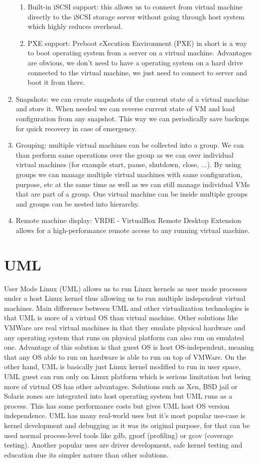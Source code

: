 \begin{enumerate}
\begin{enumerate}
\item Built-in iSCSI support: this allows us to connect from virtual machine directly to the iSCSI storage server without going through host system which
highly reduces overhead.
\item PXE support: Preboot eXecution Environment (PXE) in short is a way to boot operating system from a server on a virtual machine. Advantages are obvious, we don't need to have a operating system on a hard drive connected to the virtual machine, we just need to connect to server and boot it from there.
\end{enumerate}
\item Snapshots: we can create snapshots of the current state of a virtual machine and store it. When needed we can reverse current state of VM and load configuration from any snapshot. This way we can periodically save backups for quick recovery in case of emergency.
\item Grouping: multiple virtual machines can be collected into a group. We can than perform same operations over the group as we can over individual virtual machines (for example start, pause, shutdown, close, ...). By using groups we can manage multiple virtual machines with same configuration, purpose, etc at the same time as well as we can still manage individual VMs that are part of a group. One virtual machine can be inside multiple groups and groups can be nested into hierarchy.
\item Remote machine display: VRDE - VirtualBox Remote Desktop Extension allows for a high-performance remote access to any running virtual machine.
\end{enumerate}


\section{UML}
User Mode Linux (UML) allows us to run Linux kernels as user mode processes under a host Linux kernel thus allowing us to run multiple independent virtual machines. Main difference between UML and other virtualization technologies is that UML is more of a virtual OS than virtual machine. Other solutions like VMWare are real virtual machines in that they emulate physical hardware and any operating system that runs on physical platform can also run on emulated one. Advantage of this solution is that guest OS is host OS-independent, meaning that any OS able to run on hardware is able to run on top of VMWare. On the other hand, UML is basically just Linux kernel modified to run in user space, UML guest can run only on Linux platform which is serious limitation but being more of virtual OS has other advantages. Solutions such as Xen, BSD jail or Solaris zones are integrated into host operating system but UML runs as a process. This has some performance costs but gives UML host OS version independence. UML has many real-world uses but it's most popular use-case is kernel development and debugging as it was its original purpose, for that can be used normal process-level tools like gdb, gporf (profiling) or gcov (coverage testing). Another popular uses are driver development, safe kernel testing and education due its simpler nature than other solutions.


